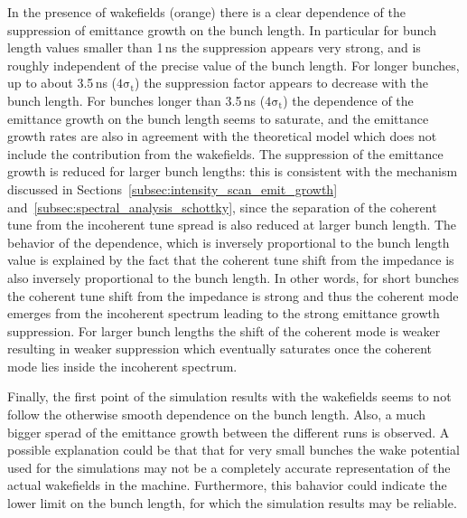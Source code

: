  In the presence of wakefields (orange) there is a clear dependence of the suppression of emittance growth on the bunch length. In particular for bunch length values smaller than 1\,ns the suppression appears very strong, and is roughly independent of the precise value of the bunch length. For longer bunches, up to about 3.5\,ns ($\mathrm{4 \sigma_t}$) the suppression factor appears to decrease with the bunch length. For bunches longer than 3.5\,ns ($\mathrm{4 \sigma_t}$) the dependence of the emittance growth on the bunch length seems to saturate, and the emittance growth rates are also in agreement with the theoretical model which does not include the contribution from the wakefields. The suppression of the emittance growth is reduced for larger bunch lengths: this is consistent with the mechanism discussed in Sections~\ref{subsec:intensity_scan_emit_growth} and~\ref{subsec:spectral_analysis_schottky}, since the separation of the coherent tune from the incoherent tune spread is also reduced at larger bunch length. The behavior of the dependence, which is inversely proportional to the bunch length value is explained by the fact that the coherent tune shift from the impedance is also inversely proportional to the bunch length. In other words, for short bunches the coherent tune shift from the impedance is strong and thus the coherent mode emerges from the incoherent spectrum leading to the strong emittance growth suppression. For larger bunch lengths the shift of the coherent mode is weaker resulting in weaker suppression which eventually saturates once the coherent mode lies inside the incoherent spectrum.

 Finally, the first point of the simulation results with the wakefields seems to not follow the otherwise smooth dependence on the bunch length. Also, a much bigger sperad of the emittance growth between the different runs is observed. A possible explanation could be that that for very small bunches the wake potential used for the simulations may not be a completely accurate representation of the actual wakefields in the machine. Furthermore, this bahavior could indicate the lower limit on the bunch length, for which the simulation results may be reliable.




